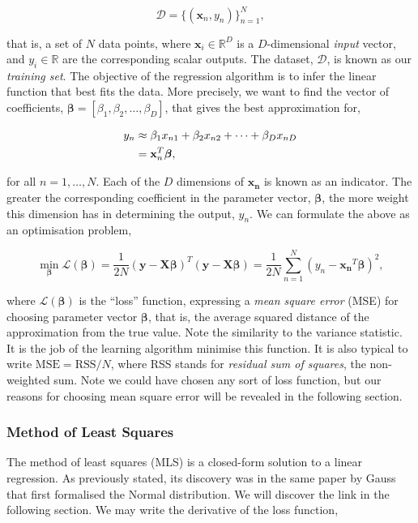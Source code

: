 \documentclass[11pt]{amsart}
\begin{document}
$$\mathcal{D} = \{(\mathbf{x}_n, y_n)\}_{n=1}^{N},$$

that is, a set of $N$ data points, where $\mathbf{x}_i \in \mathbb{R}^D$ is a $D$-dimensional \emph{input} vector, and $y_i \in \mathbb{R}$ are the corresponding scalar outputs. The dataset, $\mathcal{D}$, is known as our \emph{training set}. The objective of the regression algorithm is to infer the linear function that best fits the data. More precisely, we want to find the vector of coefficients, $\boldsymbol\beta = [\beta_1, \beta_2, \dots, \beta_D]$, that gives the best approximation for,

\begin{align}
y_n &\approx \beta_1x_{n1} + \beta_2x_{n2} + \cdots + \beta_Dx_{nD} \notag \\
&= \mathbf{x}_n^T\boldsymbol\beta, \notag
\end{align}

for all $n = 1, \dots, N$. Each of the $D$ dimensions of $\mathbf{x_n}$ is known as an indicator. The greater the corresponding coefficient in the parameter vector, $\boldsymbol\beta$, the more weight this dimension has in determining the output, $y_n$. We can formulate the above as an optimisation problem,

$$\min_{\boldsymbol\beta}\mathcal{L}(\boldsymbol\beta) = \frac{1}{2N}(\mathbf{y} - \mathbf{X}\boldsymbol\beta)^T(\mathbf{y} - \mathbf{X}\boldsymbol\beta) = \frac{1}{2N}\sum_{n=1}^{N}(y_n - \mathbf{x_n}^T\boldsymbol\beta)^2,$$

where $\mathcal{L}(\boldsymbol\beta)$ is the ``loss'' function, expressing a \emph{mean square error} (MSE) for choosing parameter vector $\boldsymbol\beta$, that is, the average squared distance of the approximation from the true value. Note the similarity to the variance statistic. It is the job of the learning algorithm minimise this function. It is also typical to write $\text{MSE} = \text{RSS}/N$, where RSS stands for \emph{residual sum of squares}, the non-weighted sum. Note we could have chosen any sort of loss function, but our reasons for choosing mean square error will be revealed in the following section.

\subsubsection{Method of Least Squares}

The method of least squares (MLS) is a closed-form solution to a linear regression. As previously stated, its discovery was in the same paper by Gauss that first formalised the Normal distribution. We will discover the link in the following section. We may write the derivative of the loss function,
\end{document}
